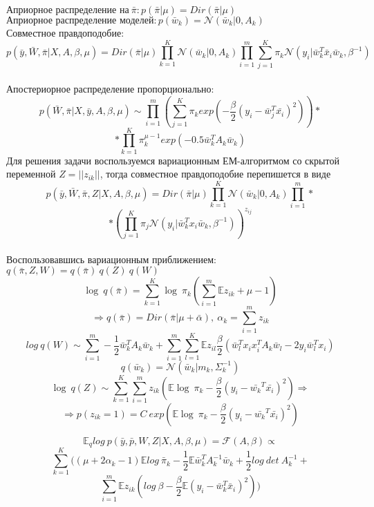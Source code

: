 \documentclass[12pt,twoside]{article}
\begin{document}
$\text{Априорное распределение на}~ \bar{\pi}: p(\bar{\pi} |\mu) = Dir(\bar{\pi}|\mu)$\\
$\text{Априорное распределение моделей}: p(\bar{w}_k) = \mathcal{N}(\bar{w}_k|0,A_k)$\\
Совместное правдоподобие:
$$p(\bar{y},\bar{W},\bar{\pi}|X,A,\beta,\mu)=Dir(\bar{\pi}|\mu)\prod\limits_{k=1}^K \mathcal{N}(\bar{w}_k|0,A_k)\prod\limits_{i=1}^m  \sum\limits_{j=1}^K\pi_k \mathcal{N}(y_i|\bar{w}_k^T \bar x_i\bar{w}_k,\beta^{-1})$$\\
Апостериорное распределение пропорционально:
$$p(\bar{W},\bar{\pi}|X,\bar y,A,\beta,\mu)\sim \prod\limits_{i=1}^m\left(\sum\limits_{j=1}^K \pi_k exp\left(-\frac{\beta}{2}(y_i - \bar{w}_j^T\bar{x_i})^2\right)\right)*$$
$$*\prod\limits_{k=1}^K\pi_k^{\mu-1}exp(-0.5\bar{w}_k^TA_k\bar{w}_k)$$
Для решения задачи воспользуемся вариационным ЕМ-алгоритмом со скрытой переменной $Z = ||z_{ik}||$, тогда совместное правдоподобие перепишется в виде
$$p(\bar{y},\bar{W},\bar{\pi},Z|X,A,\beta,\mu)=Dir(\bar{\pi}|\mu)\prod\limits_{k=1}^K \mathcal{N}(\bar{w}_k|0,A_k)\prod\limits_{i=1}^m *$$
$$*\left( \prod\limits_{j=1}^K\pi_j \mathcal{N}(y_i|\bar{w}_k^T x_i\bar{w}_k,\beta^{-1})\right)^{z_{ij}}$$\\
Воспользовавшись вариационным приближением: ~$ q(\bar{\pi},Z,W) = q(\bar{\pi})~q(Z)~q(W)$\\

$$\log~q(\bar{\pi}) = \sum\limits_{k=1}^K \log~\pi_k\left( \sum\limits_{i=1}^m\mathbb{E}z_{ik}+\mu-1\right)$$
$$ \Rightarrow q(\bar{\pi}) = Dir(\bar{\pi}|\mu + \bar{\alpha}),~ \alpha_k=\sum\limits_{i=1}^m z_{ik}$$
$$log~q(W) \sim \sum\limits_{i=1}^m-\frac{1}{2}\bar{w}_k^TA_k\bar{w}_k + \sum\limits_{i=1}^m \sum\limits_{l=1}^K \mathbb{E}z_{il}\frac{\beta}{2}\left(\bar{w}_l^Tx_ix_i^TA_k\bar{w}_l - 2y_i\bar{w}_l^Tx_i\right)$$
$$q(\bar{w}_k) = \mathcal{N}(\bar{w}_k|m_k, \Sigma_k^{-1})$$
$$\log~q(Z) \sim \sum \limits_{k=1}^{K} \sum \limits_{i=1}^{m} z_{ik} \left(\mathbb{E} \log~\pi_k - \frac{\beta}{2}(y_i-\bar{w_k}^T \bar{x_i})^2 \right) \Rightarrow$$
$$\Rightarrow p(z_{ik} = 1) = C~exp \left(\mathbb{E} \log~\pi_k -  \frac{\beta}{2}(y_i-\bar{w_k}^T \bar{x_i})^2 \right)$$

$$\mathbb{E}_q log~p(\bar{y}, \bar{p}, W, Z|X, A, \beta, \mu) = \mathcal{F}(A, \beta) \propto$$
$$\sum \limits_{k = 1}^K ((\mu +2\alpha_k - 1)\mathbb{E} log~\bar \pi_k - \frac{1}{2} \mathbb{E}\bar w_k^T A_k^{-1} \bar w_k + \frac{1}{2} log~det~A_k^{-1} +$$
$$\sum \limits_{i=1}^{m} \mathbb{E}z_{ik}(log~\beta - \frac{\beta}{2} \mathbb{E}(y_i - \bar w_k^T \bar x_i)^2))$$
\end{document}

